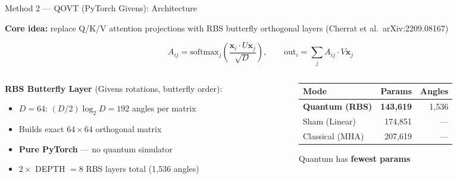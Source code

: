 \documentclass[aspectratio=169]{beamer}
\newcommand{\win}[1]{\textcolor{good}{\textbf{#1}}}
\newcommand{\qs}[1]{\textcolor{q}{\textbf{#1}}}
\begin{document}
\begin{frame}{Method 2 — QOVT (PyTorch Givens): Architecture}

\textbf{Core idea:} replace Q/K/V attention projections with RBS butterfly orthogonal layers
(Cherrat et al.\ arXiv:2209.08167)

\medskip
\[
A_{ij} = \text{softmax}_j\!\left(\frac{\mathbf{x}_i \cdot U\mathbf{x}_j}{\sqrt{D}}\right), \qquad
\text{out}_i = \sum_j A_{ij}\cdot V\mathbf{x}_j
\]

\medskip
\begin{columns}
\begin{column}{0.55\textwidth}
\textbf{RBS Butterfly Layer} (Givens rotations, butterfly order):
\begin{itemize}
  \item $D=64$: $(D/2)\log_2 D = 192$ angles per matrix
  \item Builds exact $64\times64$ orthogonal matrix
  \item \textbf{Pure PyTorch} --- no quantum simulator
  \item $2\times$ DEPTH $= 8$ RBS layers total (1,536 angles)
\end{itemize}
\end{column}
\begin{column}{0.42\textwidth}
\small
\begin{tabular}{@{}lrr@{}}
\toprule
Mode & Params & Angles \\
\midrule
\qs{Quantum (RBS)} & \win{143,619} & 1,536 \\
Sham (Linear) & 174,851 & --- \\
Classical (MHA) & 207,619 & --- \\
\bottomrule
\end{tabular}

\medskip
Quantum has \textbf{fewest params}
\end{column}
\end{columns}
\end{frame}
\end{document}

